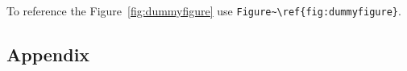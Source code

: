 \documentclass[12pt,a4paper,oneside]{tut-thesis}
\begin{document}
To reference the Figure~\ref{fig:dummyfigure} use \verb|Figure~\ref{fig:dummyfigure}|.
\blindmathpaper %

\nocite{*} %
\printbibliography[heading=bibintoc,title=References]
\label{endcontent}

\begin{appendices}
\chapter{Appendix}
\blindtext %
\end{appendices}
\label{endappendices}
\end{document}
